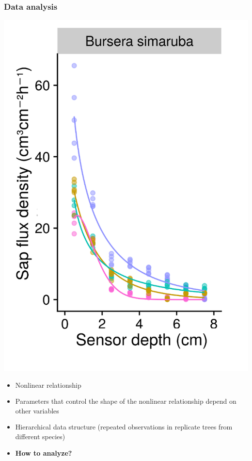 \documentclass[usepdftitle=false]{beamer}
\newcommand{\Rar}{$\Rightarrow$}
\newcommand{\tw}{\textwidth}
\begin{document}
\begin{frame}
	\frametitle{Data analysis}
	\begin{minipage}{0.38\tw}
		\includegraphics[width = \tw]{figures/HFD_05_profile_simarouba.png}
	\end{minipage}
	\begin{minipage}{0.6\tw}				
		\begin{itemize}[<+-| alert@+>]
			\item Nonlinear relationship
			\item Parameters that control the shape of the nonlinear relationship depend on other variables
			\item Hierarchical data structure (repeated observations in replicate trees from different species)		
			\item<visible@4| alert@4>[\Rar] \textbf{How to analyze?}
		\end{itemize}
	\end{minipage}
\end{frame}
\end{document}
